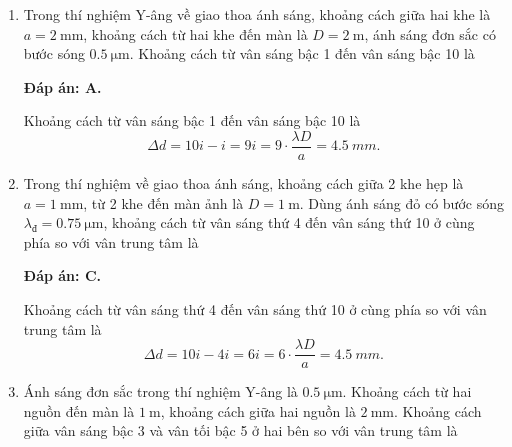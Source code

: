 \begin{enumerate}[label=\bfseries Câu \arabic*:]
{	}
	
\item {} 
	\cauhoi
	{Trong thí nghiệm Y-âng về giao thoa ánh sáng, khoảng cách giữa hai khe là $a=\SI{2}{\milli \meter}$, khoảng cách từ hai khe đến màn là $D=\SI{2}{\meter}$, ánh sáng đơn sắc có bước sóng $\SI{0.5}{\micro \meter}$. Khoảng cách từ vân sáng bậc 1 đến vân sáng bậc 10 là
	}
	
	\loigiai
	{		\textbf{Đáp án: A.}
		
Khoảng cách từ vân sáng bậc 1 đến vân sáng bậc 10 là
$$
	\Delta d = 10i - i = 9i = 9 \cdot \dfrac{\lambda D}{a} = \SI{4,5}{mm}.
$$
		
	}
	
\item {} 
	
	\cauhoi
	{Trong thí nghiệm về giao thoa ánh sáng, khoảng cách giữa 2 khe hẹp là $a=\SI{1}{\milli \meter}$, từ 2 khe đến màn ảnh là $D=\SI{1}{\meter}$. Dùng ánh sáng đỏ có bước sóng $\lambda_\text{đ}=\SI{0.75}{\micro \meter}$, khoảng cách từ vân sáng thứ 4 đến vân sáng thứ 10 ở cùng phía so với vân trung tâm là
	}
	
	\loigiai
	{		\textbf{Đáp án: C.}
		
Khoảng cách từ vân sáng thứ 4 đến vân sáng thứ 10 ở cùng phía so với vân trung tâm là
$$
	\Delta d = 10i - 4i = 6i = 6 \cdot \dfrac{\lambda D}{a} = \SI{4,5}{mm}.
$$
		
	}
	
\item {} 
	
	\cauhoi
	{Ánh sáng đơn sắc trong thí nghiệm Y-âng là $\SI{0.5}{\micro \meter}$. Khoảng cách từ hai nguồn đến màn là $\SI{1}{\meter}$, khoảng cách giữa hai nguồn là $\SI{2}{\milli \meter}$. Khoảng cách giữa vân sáng bậc 3 và vân tối bậc 5 ở hai bên so với vân trung tâm là
	}
	

\end{enumerate}
